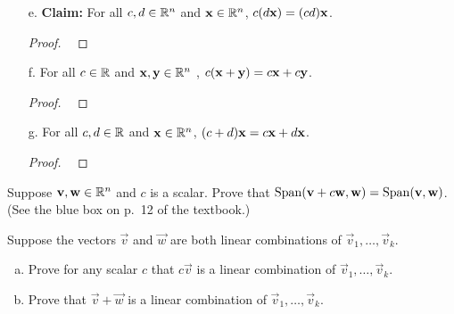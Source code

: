 \newpage

\begin{enumerate}
\item[e.] {\bf Claim:}
For all $c, d \in \mathbb{R}^n$ and $\mathbf{x} \in \mathbb{R}^n$, $c(d\mathbf{x}) = (cd)\mathbf{x}$.
\begin{proof}
  ~
\vskip5cm
\end{proof}
\item[f.] 
For all $c \in \mathbb{R}$ and $\mathbf{x}, \mathbf{y} \in \mathbb{R}^n$ , $c(\mathbf{x} + \mathbf{y}) = c\mathbf{x} + c\mathbf{y}$.
\begin{proof}
  ~
\vskip5cm
\end{proof}
\item[g.] 
For all $c, d \in \mathbb{R}$ and $\mathbf{x} \in \mathbb{R}^n$, $(c + d)\mathbf{x} = c\mathbf{x} + d\mathbf{x}$.
\begin{proof}
  ~
\vskip5cm
\end{proof}

\end{enumerate}



\newpage

\begin{problem}[SA 1.1.21]
Suppose $\mathbf{v}, \mathbf{w} \in \mathbb{R}^n$ and $c$ is a scalar. Prove that 
$\operatorname{Span} (\mathbf{v} + c\mathbf{w},\mathbf{w}) = \operatorname{Span} (\mathbf{v},\mathbf{w})$. (See the blue box on p.~12 of the textbook.)
\end{problem}



\newpage

\begin{problem}[SA 1.1.22]
Suppose the vectors $\vec{v}$ and $\vec{w}$ are both linear combinations of 
$\vec{v}_1, \dots, \vec{v}_k$.
\begin{enumerate}[a.]
\item 
Prove for any scalar $c$ that $c\vec{v}$ is a linear combination of 
$\vec{v}_1,\dots, \vec{v}_k$.
\item
Prove that $\vec{v} + \vec{w}$ is a linear combination of 
$\vec{v}_1,\dots,\vec{v}_k$.
\end{enumerate}

\end{problem}

\newpage

